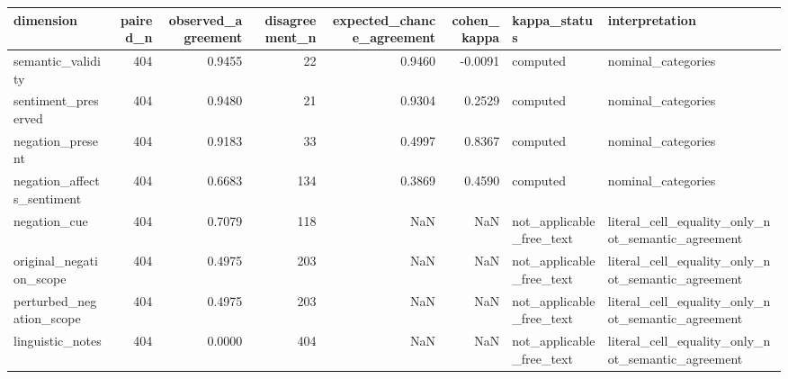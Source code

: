 \begin{tabular}{lrrrrrll}
\toprule
dimension & paired_n & observed_agreement & disagreement_n & expected_chance_agreement & cohen_kappa & kappa_status & interpretation \\
\midrule
semantic_validity & 404 & 0.9455 & 22 & 0.9460 & -0.0091 & computed & nominal_categories \\
sentiment_preserved & 404 & 0.9480 & 21 & 0.9304 & 0.2529 & computed & nominal_categories \\
negation_present & 404 & 0.9183 & 33 & 0.4997 & 0.8367 & computed & nominal_categories \\
negation_affects_sentiment & 404 & 0.6683 & 134 & 0.3869 & 0.4590 & computed & nominal_categories \\
negation_cue & 404 & 0.7079 & 118 & NaN & NaN & not_applicable_free_text & literal_cell_equality_only_not_semantic_agreement \\
original_negation_scope & 404 & 0.4975 & 203 & NaN & NaN & not_applicable_free_text & literal_cell_equality_only_not_semantic_agreement \\
perturbed_negation_scope & 404 & 0.4975 & 203 & NaN & NaN & not_applicable_free_text & literal_cell_equality_only_not_semantic_agreement \\
linguistic_notes & 404 & 0.0000 & 404 & NaN & NaN & not_applicable_free_text & literal_cell_equality_only_not_semantic_agreement \\
\bottomrule
\end{tabular}
